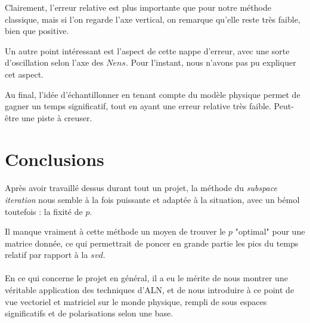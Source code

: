 \documentclass[a4paper,12pt]{article}
\begin{document}
    Clairement, l'erreur relative est plus importante que pour notre méthode
    classique, mais si l'on regarde l'axe vertical, on remarque qu'elle reste
    très faible, bien que positive.

    Un autre point intéressant est l'aspect de cette nappe d'erreur, avec une
    sorte d'oscillation selon l'axe des $Nens$. Pour l'instant, nous n'avons pas
    pu expliquer cet aspect.

    Au final, l'idée d'échantillonner en tenant compte du modèle physique permet
    de gagner un temps significatif, tout en ayant une erreur relative très
    faible. Peut-être une piste à creuser.

\newpage
\section{Conclusions}

    \paragraph{}
    Après avoir travaillé dessus durant tout un projet, la méthode du \emph{subspace
    iteration} nous semble à la fois puissante et adaptée à la situation, avec
    un bémol toutefois : la fixité de $p$.

    Il manque vraiment à cette méthode un moyen de trouver le $p$ "optimal"
    pour une matrice donnée, ce qui permettrait de \og poncer \fg en grande partie
    les pics du temps relatif par rapport à la $svd$.

    \paragraph{}
    En ce qui concerne le projet en général, il a eu le mérite de nous montrer
    une véritable application des techniques d'ALN, et de nous introduire à ce
    point de vue vectoriel et matriciel sur le monde physique, rempli de sous
    espaces significatifs et de polarisations selon une base.
\end{document}
